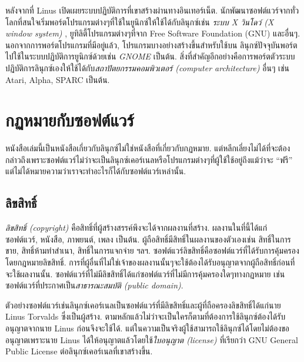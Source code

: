 \begin{thwbr}
{หลังจากที่  Linus เปิดเผยระบบปฏิบัติการที่เขาสร้างผ่านทางอินเทอร์เน็ต. นักพัฒนาซอฟต์แวร์จากทั่วโลกที่สนใจเริ่มพอร์ตโปรแกรมต่างๆที่ใช้ในยูนิกซ์ให้ใช้ได้กับลินุกซ์เช่น {\em ระบบ X วินโดว์ (X window system)}%
, ยูทิลิตี้โปรแกรมต่างๆที่จาก  Free Software Foundation (GNU)
และอื่นๆ. นอกจากการพอร์ตโปรแกรมที่มีอยู่แล้ว, โปรแกรมบางอย่างสร้างขึ้นสำหรับใช้บน
ลินุกซ์ปัจจุบันพอร์ตไปใช้ในระบบปฏิบัติการยูนิกซ์ด้วยเช่น {\em GNOME} เป็นต้น. สิ่งที่สำคัญอีกอย่างคือการพอร์ตตัวระบบปฏิบัติการลินุกซ์เองให้ใช้ได้กับ{\em สถาปัตยกรรมคอมพิวเตอร์ (computer architecture)} อื่นๆ เช่น  Atari, Alpha, SPARC เป็นต้น.



\section{กฏหมายกับซอฟต์แวร์}
หนังสือเล่มนี้เป็นหนังสือเกี่ยวกับลินุกซ์ไม่ใช่หนังสือที่เกี่ยวกับกฏหมาย. แต่หลีกเลี่ยงไม่ได้ที่จะต้องกล่าวถึงเพราะซอฟต์แวร์ไม่ว่าจะเป็นลินุกซ์เคอร์เนลหรือโปรแกรมต่างๆที่ผู้ใช้ใช้อยู่ถึงแม้ว่าจะ ``ฟรี'' แต่ไม่ได้หมายความว่าเราจะทำอะไรก็ได้กับซอฟต์แวร์เหล่านั้น.

\subsection{ลิขสิทธิ์}
{\em ลิขสิทธิ์ (copyright)}  คือสิทธิ์ที่ผู้สร้างสรรค์พึงจะได้จากผลงานที่สร้าง. ผลงานในที่นี้ได้แก่ ซอฟต์แวร์, หนังสือ, ภาพยนต์, เพลง เป็นต้น. ผู้ถือสิทธิ์มีสิทธิ์ในผลงานของตัวเองเช่น สิทธิ์ในการขาย, สิทธิ์ห้ามทำสำเนา, สิทธิ์ในการแจกจ่าย ฯลฯ. ซอฟต์แวร์ลิขสิทธิ์คือซอฟต์แวร์ที่ได้รับการคุ้มครองโดยกฎหมายลิขสิทธิ์. การที่ผู้อื่นที่ไม่ใช่เจ้าของผลงานนั้นๆจะใช้ต้องได้รับอนุญาตจากผู้ถือสิทธิ์ก่อนที่จะใช้ผลงานนั้น. ซอฟต์แวร์ที่ไม่มีลิขสิทธิ์ได้แก่ซอฟต์แวร์ที่ไม่มีการคุ้มครองใดๆทางกฏหมาย เช่นซอฟต์แวร์ที่ประกาศเป็น{\em สาธารณะสมบัติ (public domain)}.

ตัวอย่างซอฟต์แวร์เช่นลินุกซ์เคอร์เนลเป็นซอฟต์แวร์ที่มีลิขสิทธิ์และผู้ที่ถือครองลิขสิทธิ์ได้แก่นาย Linus Torvalds ซึ่งเป็นผู้สร้าง. ตามหลักแล้วไม่ว่าจะเป็นใครก็ตามที่ต้องการใช้ลินุกซ์ต้องได้รับอนุญาตจากนาย Linus ก่อนจึงจะใช้ได้. แต่ในความเป็นจริงผู้ใช้สามารถใช้ลินุกซ์ได้โดยไม่ต้องขออนุญาตเพราะนาย Linus ได้ให้อนุญาตแล้วโดยใช้{\em ใบอนุญาต (license)} ที่เรียกว่า GNU General Public License ต่อลินุกซ์เคอร์เนลที่เขาสร้างขึ้น.

}
\end{thwbr}
